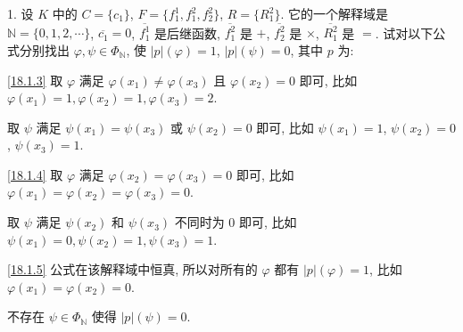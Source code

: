\documentclass[boxes]{homework}
\begin{document}
\begin{problem}
1. 设 $K$ 中的 $C = \{c_1\}$, $F=\{f_1^1, f_1^2, f_2^2\}$, $R=\{R_1^2\}$. 它的一个解释域是 $\mathbb{N}=\{0, 1, 2, \cdots\}$, $\overline{c_1}=0$, $\overline{f_1^1}$ 是后继函数, $\overline{f_1^2}$ 是 $+$, $\overline{f_2^2}$ 是 $\times$, $\overline{R_1^2}$ 是 $=$. 试对以下公式分别找出 $\varphi, \psi\in\Phi_{\mathbb{N}}$, 使 $\lvert p\rvert(\varphi) = 1$, $\lvert p\rvert(\psi) = 0$, 其中 $p$ 为:
\end{problem}

\begin{solution}
    \ref{18.1.3} 取 $\varphi$ 满足 $\varphi(x_1)\neq\varphi(x_3)$ 且 $\varphi(x_2) = 0$ 即可, 比如 $\varphi(x_1) = 1, \varphi(x_2) = 1, \varphi(x_3) = 2$.

    取 $\psi$ 满足 $\psi(x_1)=\psi(x_3)$ 或 $\psi(x_2) = 0$ 即可, 比如 $\psi(x_1) = 1$, $\psi(x_2) = 0$, $\psi(x_3) = 1$.

    \ref{18.1.4} 取 $\varphi$ 满足 $\varphi(x_2) = \varphi(x_3) = 0$ 即可, 比如 $\varphi(x_1) = \varphi(x_2) = \varphi(x_3) = 0$.

    取 $\psi$ 满足 $\psi(x_2)$ 和 $\psi(x_3)$ 不同时为 0 即可, 比如 $\psi(x_1) = 0, \psi(x_2) = 1, \psi(x_3) = 1$.

    \ref{18.1.5} 公式在该解释域中恒真, 所以对所有的 $\varphi$ 都有 $\lvert p\rvert(\varphi) = 1$, 比如 $\varphi(x_1) = \varphi(x_2) = 0$.

    不存在 $\psi\in\Phi_{\mathbb{N}}$ 使得 $\lvert p\rvert(\psi) = 0$.
\end{solution}
\end{document}
